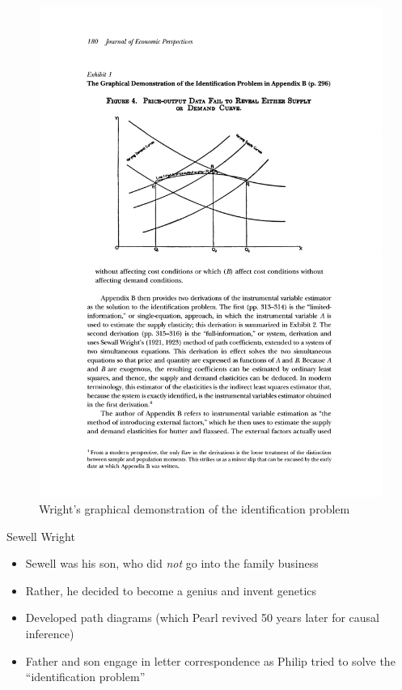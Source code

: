 \documentclass{beamer}
\begin{document}
\begin{frame}[plain]

  \begin{figure}[h]
    \includegraphics[scale=0.75]{./lecture_includes/supply_demand.pdf}
    \caption{Wright's graphical demonstration of the identification problem}
    \label{fig:sd}
  \end{figure}

\end{frame}

\begin{frame}{Sewell Wright}

  \begin{itemize}
    \item Sewell was his son, who did \emph{not} go into the family business
    \item Rather, he decided to become a genius and invent genetics
    \item Developed path diagrams (which Pearl revived 50 years later for causal inference)
    \item Father and son engage in letter correspondence as Philip tried to solve the ``identification problem''

  \end{itemize}

\end{frame}
\end{document}
